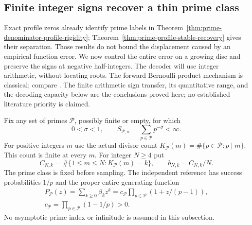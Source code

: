 \documentclass[11pt]{article}
\theoremstyle{definition}
\begin{document}
\subsection{Finite integer signs recover a thin prime class}
\label{sec:finite-integer-prime-decoding}

Exact profile zeros already identify prime labels in
Theorem~\ref{thm:prime-denominator-profile-rigidity};
Theorem~\ref{thm:prime-profile-stable-recovery} gives their
separation. Those results do not bound the displacement caused
by an empirical function error.
We now control the entire error on a growing disc and preserve
the signs at negative half-integers.
The decoder will use integer arithmetic, without locating roots.
The forward Bernoulli-product mechanism is classical; compare
\cite[Proposition~3.1]{KN}.
The finite arithmetic sign transfer, its quantitative range,
and the decoding capacity below are the conclusions proved here;
no established literature priority is claimed.

Fix any set of primes $\mathcal P$, possibly finite or empty,
for which
\begin{equation}
 0<\sigma<1,\qquad
 S_{\mathcal P,\sigma}=\sum_{p\in\mathcal P}p^{-\sigma}<\infty .
 \label{eq:finite-decoding-summability}
\end{equation}
For positive integers $m$ use the actual divisor count
$K_{\mathcal P}(m)=\#\{p\in\mathcal P:p\mid m\}$.
This count is finite at every $m$.
For integer $N\ge4$ put
\begin{equation}
 C_{N,k}=\#\{1\le m\le N:K_{\mathcal P}(m)=k\},
       \qquad b_{N,k}=C_{N,k}/N .
 \label{eq:finite-decoding-actual-counts}
\end{equation}
The prime class is fixed before sampling.
The independent reference has success probabilities $1/p$ and
the proper entire generating function
\[
 \begin{gathered}
 P_{\mathcal P}(z)=\sum_{k\ge0}\beta_kz^k
       =c_{\mathcal P}\prod_{p\in\mathcal P}(1+z/(p-1)),\\
 c_{\mathcal P}=\prod_{p\in\mathcal P}(1-1/p)>0 .
 \end{gathered}
\]
No asymptotic prime index or infinitude is assumed in this subsection.
\end{document}
